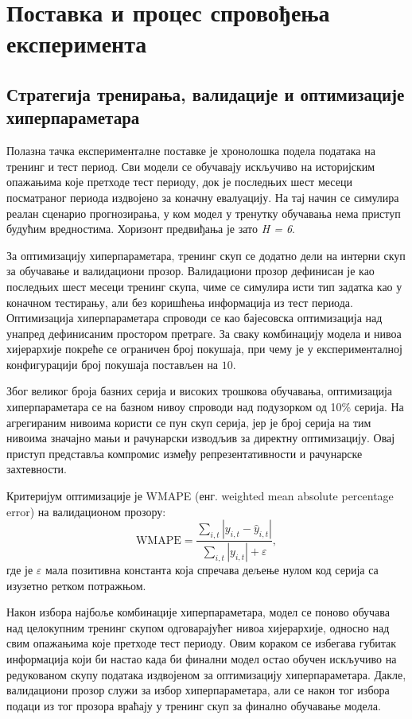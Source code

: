 \documentclass[12pt,oneside]{memoir}
\begin{document}
\section{Поставка и процес спровођења експеримента}


\subsection{Стратегија тренирања, валидације и оптимизације хиперпараметара}

Полазна тачка експерименталне поставке је хронолошка подела података на тренинг и тест период. Сви модели се обучавају искључиво на историјским опажањима које претходе тест периоду, док је последњих шест месеци посматраног периода издвојено за коначну евалуацију. На тај начин се симулира реалан сценарио прогнозирања, у ком модел у тренутку обучавања нема приступ будућим вредностима. Хоризонт предвиђања је зато \textit{H = 6}.

За оптимизацију хиперпараметара, тренинг скуп се додатно дели на интерни скуп за обучавање и валидациони прозор. Валидациони прозор дефинисан је као последњих шест месеци тренинг скупа, чиме се симулира исти тип задатка као у коначном тестирању, али без коришћења информација из тест периода. Оптимизација хиперпараметара спроводи се као бајесовска оптимизација над унапред дефинисаним простором претраге. За сваку комбинацију модела и нивоа хијерархије покреће се ограничен број покушаја, при чему је у експерименталној конфигурацији број покушаја постављен на $10$.

Због великог броја базних серија и високих трошкова обучавања, оптимизација хиперпараметара се на базном нивоу спроводи над подузорком од 10\% серија. На агрегираним нивоима користи се пун скуп серија, јер је број серија на тим нивоима значајно мањи и рачунарски изводљив за директну оптимизацију. Овај приступ представља компромис између репрезентативности и рачунарске захтевности.

Критеријум оптимизације је WMAPE (енг. weighted mean absolute percentage error) на валидационом прозору:
\begin{equation}
    \mathrm{WMAPE}
    =
    \frac{\sum_{i,t} |y_{i,t} - \hat{y}_{i,t}|}
         {\sum_{i,t} |y_{i,t}| + \varepsilon},
\end{equation}
где је $\varepsilon$ мала позитивна константа која спречава дељење нулом код серија са изузетно ретком потражњом.

Након избора најбоље комбинације хиперпараметара, модел се поново обучава над целокупним тренинг скупом одговарајућег нивоа хијерархије, односно над свим опажањима које претходе тест периоду. Овим кораком се избегава губитак информација који би настао када би финални модел остао обучен искључиво на редукованом скупу података издвојеном за оптимизацију хиперпараметара. Дакле, валидациони прозор служи за избор хиперпараметара, али се након тог избора подаци из тог прозора враћају у тренинг скуп за финално обучавање модела.
\end{document}
